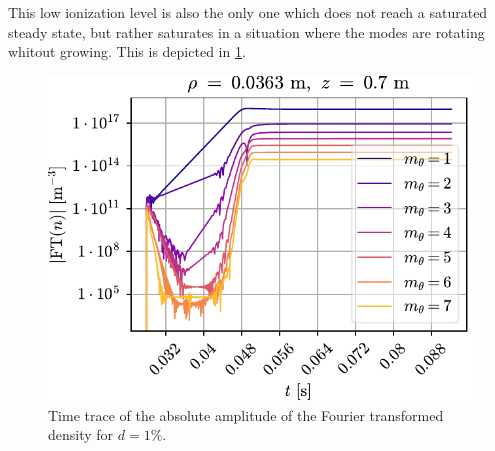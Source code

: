 This low ionization level is also the only one which does not reach a saturated steady state, but rather saturates in a situation where the modes are rotating whitout growing.
This is depicted in \cref{fig:FFTnn1pct}.
%
\begin{figure}[htb]
    \centering
    \includegraphics{fig/results/neutral/FFTnn1pct}
    \caption{Time trace of the absolute amplitude of the Fourier transformed density for $d=1\%$.}
    \label{fig:FFTnn1pct}
\end{figure}
%


